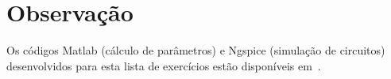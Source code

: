 \section*{Observação}

Os códigos Matlab (cálculo de parâmetros) e Ngspice (simulação de circuitos) desenvolvidos para esta lista de exercícios estão disponíveis em~\cite{cods}.